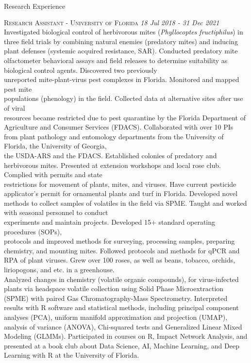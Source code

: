 \documentclass{resume} %
\begin{document}
\newpage

\begin{rSection}{Research Experience}

\textsc{Research Assistant - University of Florida} \hfill {\em \textit{18 Jul 2018 - 31 Dec 2021}}\\  Investigated biological control of herbivorous mites (\textit{Phyllocoptes fructiphilus}) in three field trials by combining natural enemies (predatory mites) and inducing plant defenses (systemic acquired resistance, SAR). Conducted predatory mite olfactometer behavioral assays and field releases to determine suitability as biological control agents.
Discovered two previously\\ 
unreported mite-plant-virus pest complexes in Florida. Monitored and mapped pest mite\\
populations (phenology) in the field. Collected data at alternative sites after use of viral\\
resources became restricted due to pest quarantine by the Florida Department of Agriculture and Consumer Services (FDACS). Collaborated with over 10 PIs from plant pathology and entomology departments from the University of Florida, the University of Georgia,\\
the USDA-ARS and the FDACS. Established colonies of predatory and herbivorous mites. Presented at extension workshops and local rose club. Complied with permits and state\\
restrictions for movement of plants, mites, and viruses. Have current pesticide applicator's permit for ornamental plants and turf in Florida. Developed novel methods to collect samples of volatiles in the field via SPME. Taught and worked with seasonal personnel to conduct\\
experiments and maintain projects. Developed 15+ standard operating procedures (SOPs),\\
protocols and improved methods for surveying, processing samples, preparing chemistry, and mounting mites. Followed protocols and methods for qPCR and RPA of plant viruses. Grew over 100 roses, as well as beans, tobacco, orchids, liriopogons, and etc. in a greenhouse.\\
Analyzed changes in chemistry (volatile organic compounds), for virus-infected plants via headspace volatile collection using Solid Phase Microextraction (SPME) with paired Gas Chromatography-Mass Spectrometry. Interpreted results with R software and statistical methods, including principal component analyses (PCA), uniform manifold approximation and projection (UMAP), analysis of variance (ANOVA), Chi-squared tests and Generalized Linear Mixed Modeling (GLMMs). Participated in courses on R, Impact Network Analysis, and presented at a book club about Data Science, AI, Machine Learning, and Deep Learning with R at the University of Florida. \\
\hfill


\end{rSection}
\end{document}
